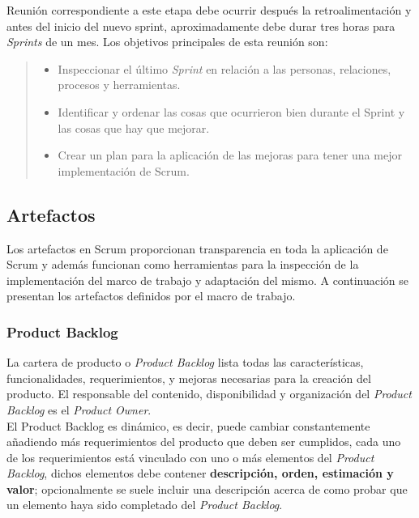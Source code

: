 \noindent Reunión correspondiente a este etapa debe ocurrir después la retroalimentación y antes del inicio del
 nuevo sprint, aproximadamente debe durar tres horas para {\it Sprints} de un mes. Los objetivos principales de
 esta reunión son:

    \begin{quote}
    \begin{itemize}
    \item Inspeccionar el último {\it Sprint} en relación a las personas, relaciones, procesos y herramientas.
    \item Identificar y ordenar las cosas que ocurrieron bien durante el Sprint y las cosas que hay que mejorar.
    \item Crear un plan para la aplicación de las mejoras para tener una mejor implementación de Scrum.
    \end{itemize}
    \end{quote}

\subsection{Artefactos}

 Los artefactos en Scrum proporcionan transparencia en toda la aplicación de Scrum
 y además funcionan como herramientas para la inspección de la implementación del
 marco de trabajo y adaptación del mismo. A continuación se presentan los artefactos
 definidos por el macro de trabajo.



\subsubsection{Product Backlog}

 La cartera de producto o {\it Product Backlog} lista todas las características, funcionalidades, requerimientos,
 y mejoras necesarias para la creación del producto. El responsable del contenido, disponibilidad y organización
 del {\it Product Backlog} es el {\it Product Owner}.\\

 \noindent El Product Backlog es dinámico, es decir, puede cambiar constantemente añadiendo más requerimientos
 del producto que deben ser cumplidos, cada uno de los requerimientos está vinculado con uno o más elementos del
 {\it Product Backlog}, dichos elementos debe contener {\bf descripción, orden, estimación y valor}; opcionalmente
 se suele incluir una descripción acerca de como probar que un elemento haya sido completado del {\it Product Backlog}.


